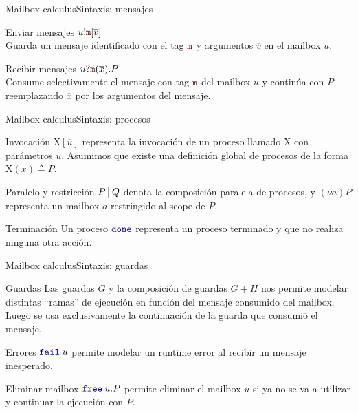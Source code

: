 \documentclass{beamer}
\newcommand{\msgtag}[1]{\texttt{\textcolor{msg-color}{#1}}}
\newcommand{\msgstore}[2]{\msgtag{#1}[\overline{#2}]}
\newcommand{\msgreceive}[2]{\msgtag{#1}(\overline{#2})}
\newcommand{\done}{\texttt{\textcolor{keyword}{done}}}
\newcommand{\free}[1]{\texttt{\textcolor{keyword}{free}}\hspace{0.25em}#1}
\newcommand{\fail}[1]{\texttt{\textcolor{keyword}{fail}}\hspace{0.25em}#1}
\newcommand{\parbar}{\kern3pt\rule[-3pt]{0.8pt}{0.9\baselineskip}\kern3pt}
\begin{document}
\begin{frame}{Mailbox calculus}{Sintaxis: mensajes}
    \begin{block}{Enviar mensajes}
        $u!\msgstore{m}{v}$
        \\ Guarda un mensaje identificado con el tag $\msgtag{m}$ y argumentos $\overline{v}$ en el mailbox $u$.
    \end{block}

    \begin{block}{Recibir mensajes}
        $u?\msgreceive{m}{x}.P$ \\ Consume selectivamente el mensaje con tag $\msgtag{m}$ del mailbox $u$ y continúa con $P$ reemplazando $\overline{x}$ por los argumentos del mensaje.
    \end{block}
\end{frame}

\begin{frame}{Mailbox calculus}{Sintaxis: procesos}
    \begin{block}{Invocación}
        $\text{X}[\overline{u}]$ representa la invocación de un proceso llamado $\text{X}$ con parámetros $\overline{u}$. Asumimos que existe una definición global de procesos de la forma $\text{X}(\overline{x}) \triangleq P$.
    \end{block}

    \begin{block}{Paralelo y restricción}
        $P \parbar Q$ denota la composición paralela de procesos, y $(\nu a) P$ representa un mailbox $a$ restringido al scope de $P$.
    \end{block}

    \begin{block}{Terminación}
        Un proceso $\done$ representa un proceso terminado y que no realiza ninguna otra acción.
    \end{block}
\end{frame}

\begin{frame}{Mailbox calculus}{Sintaxis: guardas}
    \begin{block}{Guardas}
        Las guardas $G$ y la composición de guardas $G+H$ nos permite modelar distintas ``ramas'' de ejecución en función del mensaje consumido del mailbox. Luego se usa exclusivamente la continuación de la guarda que consumió el mensaje.
    \end{block}

    \begin{block}{Errores}
        $\fail{u}$ permite modelar un runtime error al recibir un mensaje inesperado.
    \end{block}

    \begin{block}{Eliminar mailbox}
        $\free{u}.P$ permite eliminar el mailbox $u$ si ya no se va a utilizar y continuar la ejecución con $P$.
    \end{block}
\end{frame}
\end{document}

